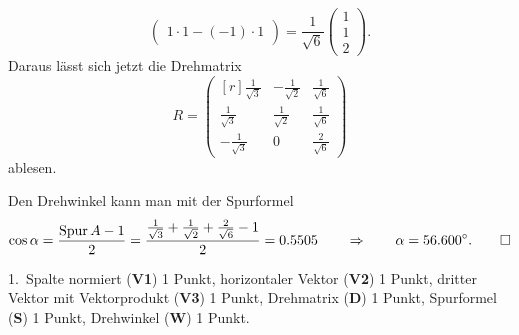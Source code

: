 \begin{loesung}
\begin{teilaufgaben}
\[\begin{pmatrix}
1\cdot 1-(-1)\cdot 1
\end{pmatrix}
=
\frac{1}{\sqrt{6}}
\begin{pmatrix}
1\\1\\2
\end{pmatrix}.
\]
Daraus lässt sich jetzt die Drehmatrix
\[
R = \begin{pmatrix*}[r]
 \frac{1}{\sqrt{3}}&-\frac{1}{\sqrt{2}}&\frac{1}{\sqrt{6}}\\
 \frac{1}{\sqrt{3}}& \frac{1}{\sqrt{2}}&\frac{1}{\sqrt{6}}\\
-\frac{1}{\sqrt{3}}&       0           &\frac{2}{\sqrt{6}}
\end{pmatrix*}
\]
ablesen.
\item
Den Drehwinkel kann man mit der Spurformel
\[
\cos\alpha
=
\frac{\operatorname{Spur}A-1}{2}
=
\frac{\frac{1}{\sqrt{3}}+\frac{1}{\sqrt{2}}+\frac{2}{\sqrt{6}}-1}{2}
=
0.5505
\qquad\Rightarrow\qquad
\alpha = 56.600^\circ.
\qedhere
\]
\end{teilaufgaben}
\end{loesung}

\begin{bewertung}
1.~Spalte normiert ({\bf V1}) 1 Punkt,
horizontaler Vektor ({\bf V2}) 1 Punkt,
dritter Vektor mit Vektorprodukt ({\bf V3}) 1 Punkt,
Drehmatrix ({\bf D}) 1 Punkt,
Spurformel ({\bf S}) 1 Punkt,
Drehwinkel ({\bf W}) 1 Punkt.
\end{bewertung}
